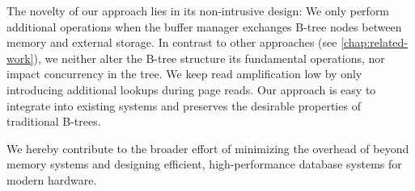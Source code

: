 The novelty of our approach lies in its non-intrusive design: 
We only perform additional operations when the buffer manager exchanges B-tree nodes between memory and external storage.
In contrast to other approaches (see \autoref{chap:related-work}), we neither alter the B-tree structure its fundamental operations, nor impact concurrency in the tree.
We keep read amplification low by only introducing additional lookups during page reads.
Our approach is easy to integrate into existing systems and preserves the desirable properties of traditional B-trees.

We hereby contribute to the broader effort of minimizing the overhead of beyond memory systems and designing efficient, high-performance database systems for modern hardware.

